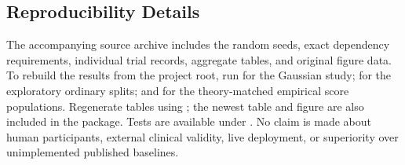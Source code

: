 \documentclass[twoside,11pt]{article}
\begin{document}
\subsection{Reproducibility Details}
The accompanying source archive includes the random seeds, exact dependency requirements, individual trial records, aggregate tables, and original figure data. To rebuild the results from the project root, run  for the Gaussian study;  for the exploratory ordinary splits; and  for the theory-matched empirical score populations. Regenerate tables using ; the newest table and figure are also included in the package. Tests are available under . No claim is made about human participants, external clinical validity, live deployment, or superiority over unimplemented published baselines.
\end{document}

